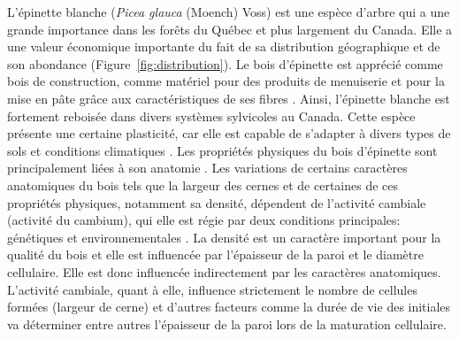\documentclass[a4paper,12pt]{report}
\begin{document}
L'épinette blanche (\textit{Picea glauca} (Moench) Voss) est une espèce d'arbre qui a une grande importance dans les forêts du Québec et plus largement du Canada. Elle a une valeur économique importante du fait de sa distribution géographique et de son abondance (Figure~\ref{fig:distribution}). Le bois d'épinette est apprécié comme bois de construction, comme matériel pour des produits de menuiserie et pour la mise en pâte grâce aux caractéristiques de ses fibres \citep{Zhang2008}. Ainsi, l'épinette blanche est fortement reboisée dans  divers systèmes sylvicoles au Canada. Cette espèce présente une certaine plasticité, car elle est capable de s'adapter à divers types de sols et conditions climatiques \citep{Nienstaedt1990}. Les propriétés physiques du bois d'épinette sont principalement liées à son anatomie \citep{Rossi2012}. Les variations de certains caractères anatomiques du bois tels que la largeur des cernes et de certaines de ces propriétés physiques, notamment sa densité, dépendent de l'activité cambiale (activité du cambium), qui elle est régie par deux conditions principales: génétiques et environnementales \citep{Dufour2010,Rossi2012}. La densité est un caractère important pour la qualité du bois et elle est influencée par l'épaisseur de la paroi et le diamètre cellulaire. Elle est donc influencée indirectement par les caractères anatomiques. L'activité cambiale, quant à elle, influence strictement le nombre de cellules formées (largeur de cerne) et d'autres facteurs comme la durée de vie des initiales va déterminer entre autres l'épaisseur de la paroi lors de la maturation cellulaire.\\
\end{document}
